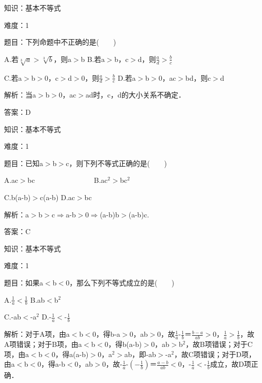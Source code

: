 \documentclass{article} %
\begin{document}

知识：基本不等式

难度：1

题目：下列命题中不正确的是(　　)

A.若$\sqrt[3]{a}\mathrm{>}\sqrt[3]{b}$，则a$\mathrm{>}$b   B.若a$\mathrm{>}$b，c$\mathrm{>}$d，则$\frac{a}{d}\mathrm{>}\frac{b}{c}$

C.若a$\mathrm{>}$b$\mathrm{>}$0，c$\mathrm{>}$d$\mathrm{>}$0，则$\frac{a}{d}\mathrm{>}\frac{b}{c}$   D.若a$\mathrm{>}$b$\mathrm{>}$0，ac$\mathrm{>}$bd，则c$\mathrm{>}$d

解析：当a$\mathrm{>}$b$\mathrm{>}$0，ac$\mathrm{>}$ad时，c，d的大小关系不确定．

答案：D　



知识：基本不等式

难度：1

题目：已知a$\mathrm{>}$b$\mathrm{>}$c，则下列不等式正确的是(　　)

A.ac$\mathrm{>}$bc　　　　　　　　   B.ac${}^{2}$$\mathrm{>}$bc${}^{2}$

C.b(a-b)$\mathrm{>}$c(a-b)   D.{\textbar}ac{\textbar}$\mathrm{>}${\textbar}bc{\textbar}

解析：a$\mathrm{>}$b$\mathrm{>}$c$\mathrm{\Rightarrow }$a-b$\mathrm{>}$0$\mathrm{\Rightarrow }$(a-b)b$\mathrm{>}$(a-b)c.

答案：C



知识：基本不等式

难度：1

题目：如果a$\mathrm{<}$b$\mathrm{<}$0，那么下列不等式成立的是(　　)

A.$\frac{1}{a}\mathrm{<}\frac{1}{b}$   B.ab$\mathrm{<}$b${}^{2}$

C.-ab$\mathrm{<}$-a${}^{2}$   D.-$\frac{1}{a}\mathrm{<}$-$\frac{1}{b}$

解析：对于A项，由a$\mathrm{<}$b$\mathrm{<}$0，得b-a$\mathrm{>}$0，ab$\mathrm{>}$0，故$\frac{1}{a}$-$\frac{1}{b}$＝$\frac{b-a}{ab}\mathrm{>}$0，$\frac{1}{a}\mathrm{>}\frac{1}{b}$，故A项错误；对于B项，由a$\mathrm{<}$b$\mathrm{<}$0，得b(a-b)$\mathrm{>}$0，ab$\mathrm{>}$b${}^{2}$，故B项错误；对于C项，由a$\mathrm{<}$b$\mathrm{<}$0，得a(a-b)$\mathrm{>}$0，a${}^{2}$$\mathrm{>}$ab，即-ab$\mathrm{>}$-a${}^{2}$，故C项错误；对于D项，由a$\mathrm{<}$b$\mathrm{<}$0，得a-b$\mathrm{<}$0，ab$\mathrm{>}$0，故-$\frac{1}{a}$-$(-\frac{1}{b})$＝$\frac{a-b}{ab}\mathrm{<}$0，-$\frac{1}{a}\mathrm{<}$-$\frac{1}{b}$成立，故D项正确．
\end{document}
